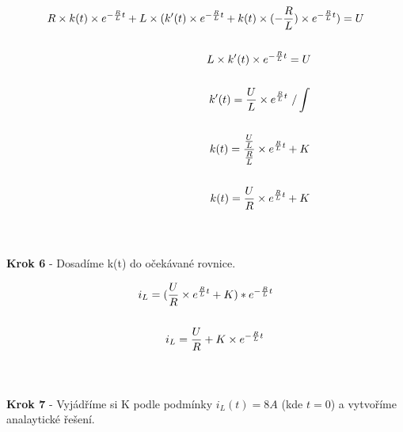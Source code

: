 \begin{gather*}
R \times k(t) \times e^{-\frac{R}{L}t} + L \times (k'(t) \times e^{-\frac{R}{L}t} + k(t) \times (-\frac{R}{L}) \times e^{-\frac{R}{L}t}) = U \\\\
\newline
\newline
L \times k'(t) \times e^{-\frac{R}{L}t} = U \\\\
\newline
\newline
k'(t) = \frac{U}{L} \times e^{\frac{R}{L}t} \ / \int \\\\
\newline
\newline
k(t) = \frac{\frac{U}{L}}{\frac{R}{L}} \times e^{\frac{R}{L}t} + K \\\\
\newline
\newline
k(t) = \frac{U}{R} \times e^{\frac{R}{L}t} + K\\\\
\newline
\newline
\end{gather*}

\newpage

\begin{center}
\textbf{Krok 6} - Dosadíme k(t) do očekávané rovnice. \\
\end{center}
\vspace{-0.5cm}

\begin{gather*}
i_L =  (\frac{U}{R} \times e^{\frac{R}{L}t} + K) * e^{-\frac{R}{L}t} \\\\
\newline
\newline
i_L = \frac{U}{R} + K \times e^{-\frac{R}{L}t}\\\\
\newline
\newline
\end{gather*}

\begin{center}
\textbf{Krok 7} - Vyjádříme si K podle podmínky $i_L(t) = 8 A$ (kde $t = 0$) a vytvoříme analaytické řešení. \\
\end{center}
\vspace{-0.5cm}

